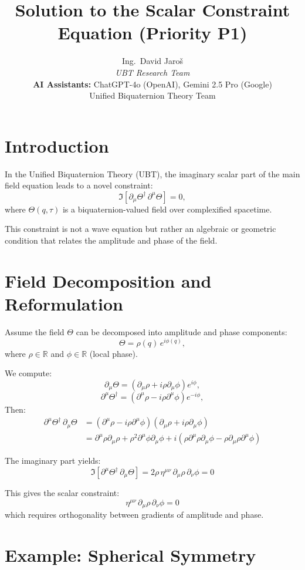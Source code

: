 \documentclass[12pt]{article}
\title{Solution to the Scalar Constraint Equation (Priority P1)}
\author{
Ing.~David Jaroš \\
\textit{UBT Research Team} \\
\textbf{AI Assistants:} ChatGPT-4o (OpenAI), Gemini 2.5 Pro (Google) \\
Unified Biquaternion Theory Team}
\date{}
\begin{document}
\maketitle

\section{Introduction}

In the Unified Biquaternion Theory (UBT), the imaginary scalar part of the main field equation leads to a novel constraint:
\[
\Im \left[\partial_\mu \Theta^\dagger \, \partial^\mu \Theta \right] = 0,
\]
where $\Theta(q, \tau)$ is a biquaternion-valued field over complexified spacetime.

This constraint is not a wave equation but rather an algebraic or geometric condition that relates the amplitude and phase of the field.

\section{Field Decomposition and Reformulation}

Assume the field $\Theta$ can be decomposed into amplitude and phase components:
\[
\Theta = \rho(q) \, e^{i\phi(q)},
\]
where $\rho \in \mathbb{R}$ and $\phi \in \mathbb{R}$ (local phase).

We compute:
\[
\partial_\mu \Theta = (\partial_\mu \rho + i\rho \partial_\mu \phi) e^{i\phi},
\]
\[
\partial^\mu \Theta^\dagger = (\partial^\mu \rho - i\rho \partial^\mu \phi) e^{-i\phi},
\]
Then:
\begin{align*}
\partial^\mu \Theta^\dagger \, \partial_\mu \Theta &= (\partial^\mu \rho - i\rho \partial^\mu \phi)(\partial_\mu \rho + i\rho \partial_\mu \phi) \\
&= \partial^\mu \rho \partial_\mu \rho + \rho^2 \partial^\mu \phi \partial_\mu \phi + i \left( \rho \partial^\mu \rho \partial_\mu \phi - \rho \partial_\mu \rho \partial^\mu \phi \right)
\end{align*}

The imaginary part yields:
\[
\Im \left[ \partial^\mu \Theta^\dagger \, \partial_\mu \Theta \right] = 2\rho \, \eta^{\mu\nu} \, \partial_\mu \rho \, \partial_\nu \phi = 0
\]

This gives the scalar constraint:
\[
\eta^{\mu\nu} \, \partial_\mu \rho \, \partial_\nu \phi = 0
\]
which requires orthogonality between gradients of amplitude and phase.

\section{Example: Spherical Symmetry}
\end{document}
